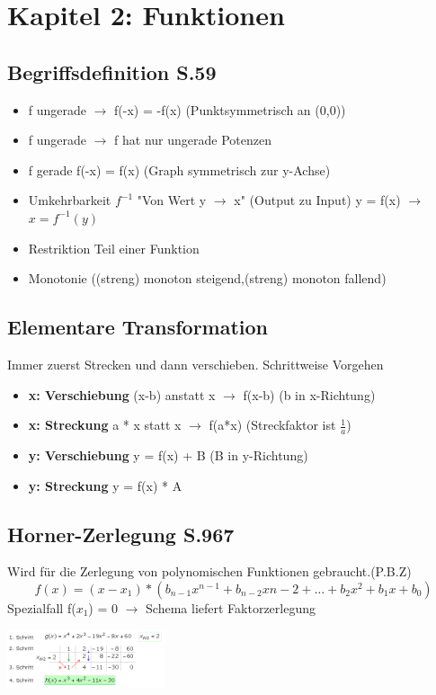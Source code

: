 \documentclass{article}
\begin{document}
		\section{Kapitel 2: Funktionen}
		\begin{multicols}{2}
		\subsection{Begriffsdefinition S.59}
	\begin{itemize}
		\item f ungerade $\rightarrow$ f(-x) = -f(x) (Punktsymmetrisch an (0,0))
		\item f ungerade $\rightarrow$ f hat nur ungerade Potenzen
		\item f gerade f(-x) = f(x) (Graph symmetrisch zur y-Achse)
		\item Umkehrbarkeit $f^{-1}$ "Von Wert y $\rightarrow$ x" (Output zu Input) 
		\subitem y = f(x) $\rightarrow$ $x = f^{-1}(y)$
		\item Restriktion Teil einer Funktion 
		\item Monotonie ((streng) monoton steigend,(streng) monoton fallend)
	\end{itemize}
	\columnbreak
	\subsection{Elementare Transformation}
	Immer zuerst Strecken und dann verschieben. Schrittweise Vorgehen
	\begin{itemize}
	    \item \textbf{x: Verschiebung} (x-b) anstatt x $\rightarrow$ f(x-b) (b in x-Richtung)
	    \item \textbf{x: Streckung} a * x statt x $\rightarrow$ f(a*x) (Streckfaktor ist $\frac{1}{a}$)
	    \item \textbf{y: Verschiebung} y = f(x) + B (B in y-Richtung)
	    \item \textbf{y: Streckung} y = f(x) * A
	\end{itemize}
		\end{multicols}
	\subsection{Horner-Zerlegung S.967}
	Wird für die Zerlegung von polynomischen Funktionen gebraucht.(P.B.Z)
	\begin{equation}
		f(x) = (x - x_1) * (b_{n-1}x^{n-1} + b_{n-2}x{n-2} + \dots + b_2x^2 + b_1x + b_0) 
	\end{equation}
	Spezialfall f($x_1$) = 0 $\rightarrow$ Schema liefert Faktorzerlegung 
	\begin{center}
	    \includegraphics[width=0.35\textwidth]{Horner.png}
	\end{center}
\end{document}
